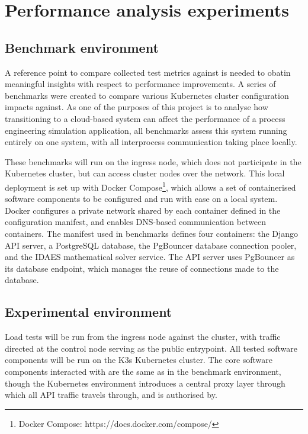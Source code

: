 \section{Performance analysis experiments}
\subsection{Benchmark environment}

A reference point to compare collected test metrics against is needed to obatin meaningful insights with respect to performance improvements. A series of benchmarks were created to compare various Kubernetes cluster configuration impacts against. As one of the purposes of this project is to analyse how transitioning to a cloud-based system can affect the performance of a process engineering simulation application, all benchmarks assess this system running entirely on one system, with all interprocess communication taking place locally.

These benchmarks will run on the ingress node, which does not participate in the Kubernetes cluster, but can access cluster nodes over the network. This local deployment is set up with Docker Compose\footnote{Docker Compose: https://docs.docker.com/compose/}, which allows a set of containerised software components to be configured and run with ease on a local system. Docker configures a private network shared by each container defined in the configuration manifest, and enables DNS-based communication between containers. The manifest used in benchmarks defines four containers: the Django API server, a PostgreSQL database, the PgBouncer database connection pooler, and the IDAES mathematical solver service. The API server uses PgBouncer as its database endpoint, which manages the reuse of connections made to the database. 

\subsection{Experimental environment}

Load tests will be run from the ingress node against the cluster, with traffic directed at the control node serving as the public entrypoint. All tested software components will be run on the K3s Kubernetes cluster. The core software components interacted with are the same as in the benchmark environment, though the Kubernetes environment introduces a central proxy layer through which all API traffic travels through, and is authorised by.

